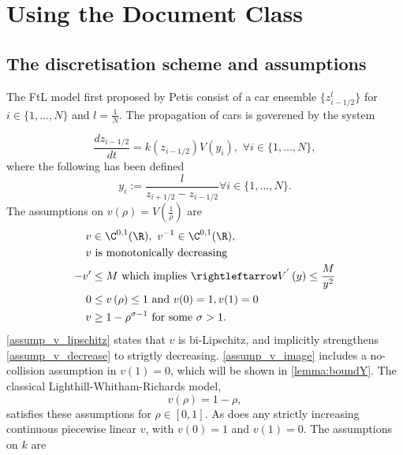 \chapter{Using the Document Class}
\label{chap:usage}


\section{The discretisation scheme and assumptions}
The FtL model first proposed by Petis consist of a car ensemble $\{z^l_{i-1/2}\}$ for $i \in \{1,...,N\}$ and $l = \frac{1}{N}$. The propagation of cars is goverened by the system


\begin{equation} \label{FtL_model}
    \frac{d z_{i-1/2}}{dt} = k(z_{i-1/2}) V( y_i), \, \, \forall i \in \{1,...,N\}, 
\end{equation}
where the following has been defined 
\begin{equation}
    y_i := \frac{l}{z_{i+1/2} - z_{i-1/2}} \forall i \in \{1,...,N\}.  
\end{equation}
The assumptions on $v\left(\rho\right) = V\left(\frac{1}{\rho}\right)$ are 
\begin{align} 
    v &\in \C^{0,1}(\R), \, \, v^{-1} \in \C^{0,1}(\R), \label{assump_v_lipschitz} \\
    v &\text{ is monotonically decreasing} \label{assump_v_decrease}\\
    -v' &\leq M \text{ which implies }\rightleftarrow V^{'}\left(y\right) \leq \frac{M}{y^2} \label{assump_v_derivative}\\
    0&\leq v\left(\rho\right) \leq 1 \text{ and } v(0) = 1, v(1) = 0\label{assump_v_image}\\
    v&\geq 1 - \rho^{\sigma - 1} \text{ for some } \sigma > 1 \label{assump_v_lower_bound}. 
\end{align}
\eqref{assump_v_lipschitz} states that $v$ is bi-Lipschitz, and implicitly strengthens \eqref{assump_v_decrease} to strigtly decreasing. \eqref{assump_v_image} includes a no-collision assumption in $v(1) = 0$, which will be shown in \eqref{lemma:boundY}. The classical Lighthill-Whitham-Richards model, 
\begin{equation}
    v(\rho) = 1 - \rho,
\end{equation}
satisfies these assumptions for $\rho \in [0,1]$. As does any strictly increasing continuous piecewise linear $v$, with $v(0) = 1$ and $v(1) = 0$. 
The assumptions on $k$ are 

